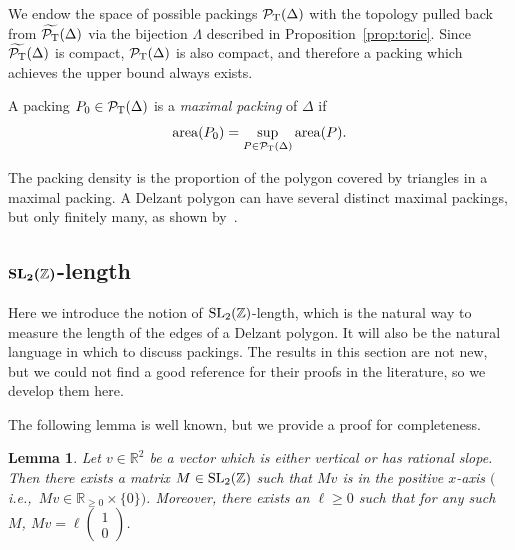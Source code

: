 \documentclass[pdftex]{sigma}
\numberwithin{equation}{section}
\newtheorem{Lemma}[Theorem]{Lemma}
\def\R{{\mathbb R}}
\def\Z{{\mathbb Z}}
\newcommand{\De}{\Delta}
\newcommand{\area}{\operatorname{area}}
\newcommand{\PT}{\mathcal{P}_{\rm T}}
\newcommand{\PTtilde}{\widetilde{\PT}}
\newcommand{\SL}{{\rm SL}_2(\Z)}
\begin{document}
We endow the space of possible packings $\PT(\De)$ with the topology pulled back from $\PTtilde(\De)$ via the bijection $\Lambda$ described in Proposition~\ref{prop:toric}.
Since $\PTtilde(\De)$ is compact, $\PT(\De)$ is also compact, and therefore
a packing which achieves the upper bound always exists.


\begin{Definition}
A packing $P_0 \in \PT(\De)$ is a \emph{maximal packing} of $\De$ if \[\area(P_0) = \sup_{P \in \PT(\De)} \area(P).\]
\end{Definition}







The packing density is the proportion of the polygon covered by triangles in a maximal packing.
A Delzant polygon can have several distinct maximal packings, but only finitely many, as shown by~\cite[Proposition 1.4]{PeSc2008}.









\subsection[SL2Z-length]{\texorpdfstring{$\boldsymbol{\SL}$}{SL2Z}-length}
Here we introduce the notion of $\SL$-length, which is the natural way to measure the length of the edges of a Delzant polygon.
It will also be the natural language in which to discuss packings.
The results in this section are not new, but we could not find a good reference for their proofs in the literature, so we develop them here.

The following lemma is well known, but we provide a proof for completeness.


\begin{Lemma}\label{lem:SL2Z-vect}
 Let $v\in \R^2$ be a vector which is either vertical or has rational slope. Then there exists a matrix $M\in\SL$ such that $Mv$ is in the positive $x$-axis $($i.e.,~$Mv\in \R_{\geq 0}\times \{0\})$.
 Moreover, there exists an $\ell\geq 0$ such that for any such $M$, $Mv = \ell \left(\begin{smallmatrix}1 \\ 0\end{smallmatrix}\right)$.
\end{Lemma}
\end{document}

